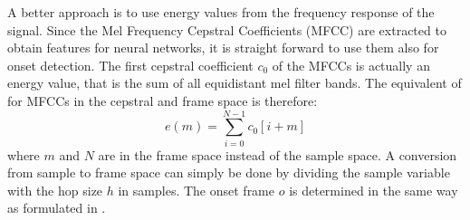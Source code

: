 A better approach is to use energy values from the frequency response of the signal.
Since the Mel Frequency Cepstral Coefficients (MFCC) are extracted to obtain features for neural networks, it is straight forward to use them also for onset detection.
The first cepstral coefficient $c_0$ of the MFCCs is actually an energy value, that is the sum of all equidistant mel filter bands.
The equivalent of  for MFCCs in the cepstral and frame space is therefore:
\begin{equation}
  e(m) = \sum_{i=0}^{N-1} c_0[i + m]
\end{equation}
where $m$ and $N$ are in the frame space instead of the sample space.
A conversion from sample to frame space can simply be done by dividing the sample variable with the hop size $h$ in samples.
The onset frame $o$ is determined in the same way as formulated in .

